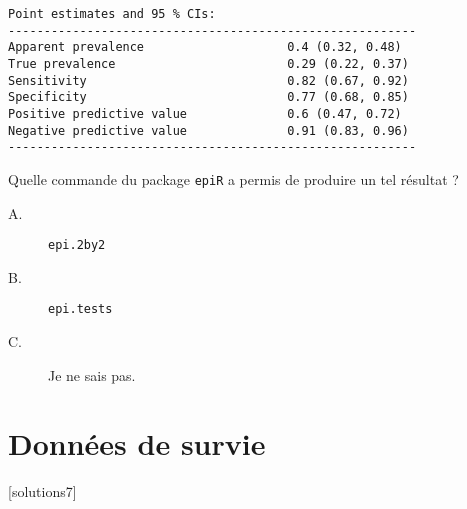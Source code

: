 \documentclass[11pt]{report}
\theoremstyle{definition}
\begin{document}
\begin{description}
\begin{verbatim}
Point estimates and 95 % CIs:
---------------------------------------------------------
Apparent prevalence                    0.4 (0.32, 0.48)
True prevalence                        0.29 (0.22, 0.37)
Sensitivity                            0.82 (0.67, 0.92)
Specificity                            0.77 (0.68, 0.85)
Positive predictive value              0.6 (0.47, 0.72)
Negative predictive value              0.91 (0.83, 0.96)
---------------------------------------------------------
\end{verbatim}
  Quelle commande du package \texttt{epiR} a permis de produire un tel
  résultat ? 
  \begin{description}
  \item[A.] \verb|epi.2by2|
  \item[B.] \verb|epi.tests|
  \item[C.] Je ne sais pas.
  \end{description}
\end{description}

\chapter{Données de survie}\label{chap:survival}
[solutions7]
\end{document}
